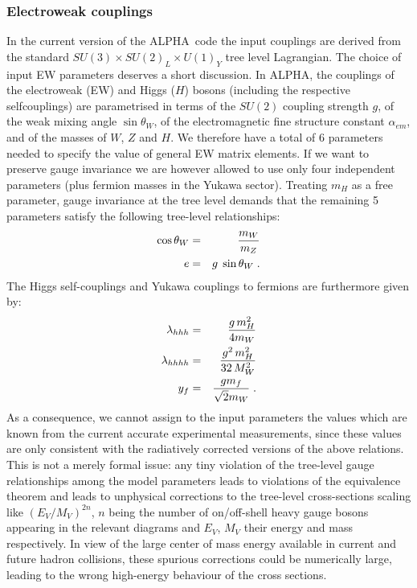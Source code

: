 \documentclass[paper]{JHEP3}
\def    \ba             {\begin{eqnarray}}
\def    \ea             {\end{eqnarray}}
\def    \frac           #1#2{{#1 \over #2}}
\def    \mZ             {\mbox{$m_Z$} }
\def    \mW             {\mbox{$m_W$} }
\def    \mH             {\mbox{$m_H$} }
\def    \mHsq             {\mbox{$m_H^2$} }
\def\ALPHA{{\small ALPHA}}
\begin{document}
\subsubsection{Electroweak couplings}
In the current version of the \ALPHA\ code the input couplings are
derived from the standard $SU(3)\times SU(2)_L \times U(1)_Y$ tree
level Lagrangian.  The choice of input EW parameters deserves a short
discussion. In \ALPHA, the couplings of the electroweak (EW) and Higgs
($H$) bosons (including the respective selfcouplings) are parametrised
in terms of the $SU(2)$ coupling strength $g$, of the weak mixing
angle $\sin\theta_W$, of the electromagnetic fine structure constant
$\alpha_{em}$, and of the masses of $W$, $Z$ and $H$. We therefore
have a total of 6 parameters needed to specify the value of general EW
matrix elements. If we want to preserve gauge invariance we are
however allowed to use only four independent parameters (plus fermion
masses in the Yukawa sector). Treating $\mH$ as a free parameter,
gauge invariance at the tree level demands that the remaining 5
parameters satisfy the following tree-level relationships: \ba
\cos \theta_W & = & \frac {\mW} {\mZ} \\
e &=& g \; \sin\theta_W \; . \ea The Higgs self-couplings and Yukawa
couplings to fermions are furthermore given by: \ba
\lambda_{hhh} & = & \frac{g \, \mHsq}{4\mW} \\
\lambda_{hhhh} & = & \frac{g^2 \, \mHsq}{32 \, M^2_W} \\
y_f & = & \frac{gm_f}{\sqrt{2}\mW} \; . \ea As a consequence, we cannot
assign to the input parameters the values which are known from the
current accurate experimental measurements, since these values are
only consistent with the radiatively corrected versions of the above
relations.  This is not a merely formal issue: any tiny violation of
the tree-level gauge relationships among the model parameters leads to
violations of the equivalence theorem and leads to unphysical
corrections to the tree-level cross-sections scaling like
$(E_V/M_V)^{2n}$, $n$ being the number of on/off-shell heavy gauge
bosons appearing in the relevant diagrams and $E_V$, $M_V$ their
energy and mass respectively.  In view of the large center of mass
energy available in current and future hadron collisions, these
spurious corrections could be numerically large, leading to the wrong
high-energy behaviour of the cross sections.
\end{document}
